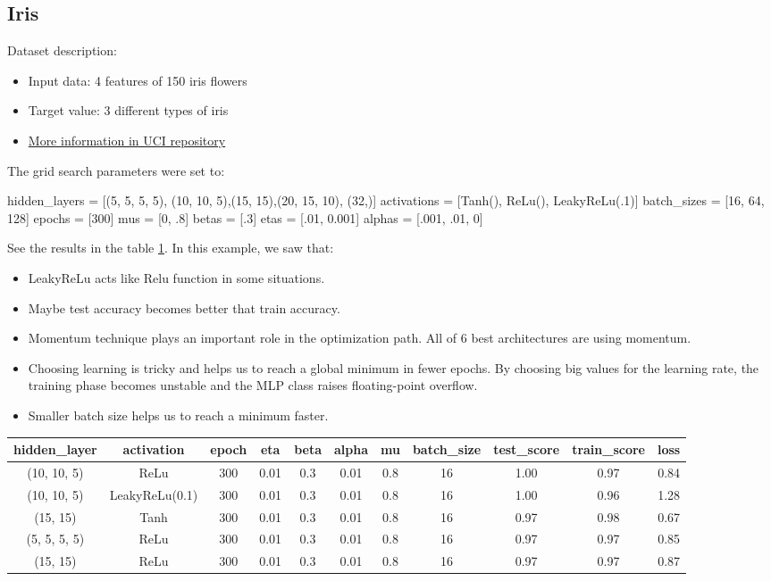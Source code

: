 \documentclass[10pt]{SelfArx} %
\begin{document}
	\subsection{Iris}
	Dataset description:
	\begin{itemize}
		\item Input data: 4 features of 150 iris flowers
		
		\item Target value: 3 different types of iris	
		
		\item \href{https://archive.ics.uci.edu/ml/datasets/Iris}{More information in UCI repository}
	\end{itemize}
	The grid search parameters were set to:
	\begin{python}
hidden_layers = [(5, 5, 5, 5),
(10, 10, 5),(15, 15),(20, 15, 10),
(32,)]
activations = [Tanh(), ReLu(),
LeakyReLu(.1)]
batch_sizes = [16, 64, 128]
epochs = [300]
mus = [0, .8]
betas = [.3]
etas = [.01, 0.001]
alphas = [.001, .01, 0]
	\end{python}
	See the results in the table \ref{tiris}. In this example, we saw that:
	\begin{itemize}
		\item  LeakyReLu acts like Relu function in some situations.
		\item  Maybe test accuracy becomes better that train accuracy.
		\item  Momentum technique plays an important role in the optimization path. All of 6 best architectures are using momentum.
		\item  Choosing learning is tricky and helps us to reach a global minimum in fewer epochs. By choosing big values for the learning rate, the training phase becomes unstable and the MLP class raises floating-point overflow.
		\item  Smaller batch size helps us to reach a minimum faster.
	\end{itemize}
	\begin{table}[hbt]
		\centering
		\begin{tabular*}{1\textwidth}{@{\extracolsep{\fill} }ccccccccccc@{}}
			\toprule
			hidden\_layer & activation & epoch & eta & beta & alpha & mu & batch\_size & test\_score & train\_score & loss \\ \midrule
			(10, 10, 5) & ReLu & 300 & 0.01 & 0.3 & 0.01 & 0.8 & 16 & 1.00 & 0.97 & 0.84 \\
			(10, 10, 5) & LeakyReLu(0.1) & 300 & 0.01 & 0.3 & 0.01 & 0.8 & 16 & 1.00 & 0.96 & 1.28 \\
			(15, 15) & Tanh & 300 & 0.01 & 0.3 & 0.01 & 0.8 & 16 & 0.97 & 0.98 & 0.67 \\
			(5, 5, 5, 5) & ReLu & 300 & 0.01 & 0.3 & 0.01 & 0.8 & 16 & 0.97 & 0.97 & 0.85 \\
			(15, 15) & ReLu & 300 & 0.01 & 0.3 & 0.01 & 0.8 & 16 & 0.97 & 0.97 & 0.87 \\ \bottomrule
		\end{tabular*}
		\label{tiris}
	\end{table}
\end{document}
